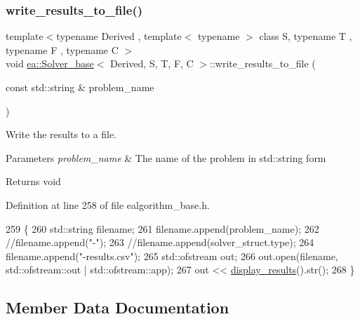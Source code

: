 \subsubsection{\texorpdfstring{write\+\_\+results\+\_\+to\+\_\+file()}{write\_results\_to\_file()}}
{\footnotesize\ttfamily template$<$typename Derived , template$<$ typename $>$ class S, typename T , typename F , typename C $>$ \\
void \hyperlink{classea_1_1_solver__base}{ea\+::\+Solver\+\_\+base}$<$ Derived, S, T, F, C $>$\+::write\+\_\+results\+\_\+to\+\_\+file (\begin{DoxyParamCaption}\item[{const std\+::string \&}]{problem\+\_\+name }\end{DoxyParamCaption})\hspace{0.3cm}{\ttfamily [protected]}}



Write the results to a file. 


\begin{DoxyParams}{Parameters}
{\em problem\+\_\+name} & The name of the problem in std\+::string form \\
\hline
\end{DoxyParams}
\begin{DoxyReturn}{Returns}
void 
\end{DoxyReturn}


Definition at line 258 of file ealgorithm\+\_\+base.\+h.


\begin{DoxyCode}
259     \{
260         std::string filename;
261         filename.append(problem\_name);
262         \textcolor{comment}{//filename.append("-");}
263         \textcolor{comment}{//filename.append(solver\_struct.type);}
264         filename.append(\textcolor{stringliteral}{"-results.csv"});
265         std::ofstream out;
266         out.open(filename, std::ofstream::out | std::ofstream::app);
267         out << \hyperlink{classea_1_1_solver__base_ae16049f3e8586c144165fa2916ccdbce}{display\_results}().str();
268     \}
\end{DoxyCode}


\subsection{Member Data Documentation}
\mbox{\label{classea_1_1_solver__base_a6914e89d30e7484f2b4af1783f0de8c3}} 
